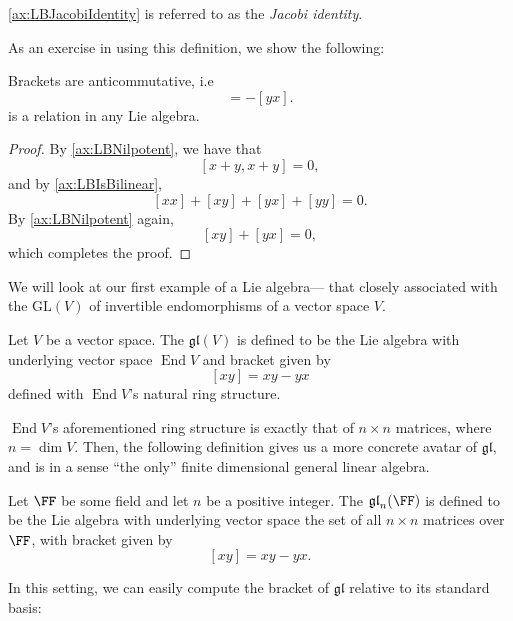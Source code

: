 \documentclass{article}
\newcommand{\lb}[1]{\ensuremath{\left[{#1}\right]}}
\DeclareMathOperator{\End}{End}
\newcommand{\GL}{\ensuremath{\text{GL}}}
\newcommand{\glalg}{\ensuremath{\mathfrak{gl}}}
\begin{document}
\ref{ax:LBJacobiIdentity} is referred to as the \textit{Jacobi identity}.

As an exercise in using this definition, we show the following:

\begin{proposition}
    Brackets are anticommutative, i.e
    \begin{equation}
        [xy]
        =
        -[yx].
        \tag{L2'}
    \end{equation}
    is a relation in any Lie algebra.
\end{proposition}
\begin{proof}
    By \ref{ax:LBNilpotent}, we have that
    \[
        \lb{x+y,x+y}
        =
        0,
    \]
    and by \ref{ax:LBIsBilinear},
    \[
        \lb{xx} + \lb{xy} + \lb{yx} + \lb{yy}
        =
        0.
    \]
    By \ref{ax:LBNilpotent} again,
    \[
        \lb{xy} + \lb{yx}
        =
        0,
    \]
    which completes the proof.
\end{proof}

We will look at our first example of a Lie algebra--- that closely associated with the  $\GL(V)$ of invertible endomorphisms of a vector space $V$.

\begin{definition}[$\glalg$, abstractly]
    Let $V$ be a vector space.
    The  $\glalg(V)$ is defined to be the Lie algebra with underlying vector space $\End V$ and bracket given by
    \[
        \lb{xy}
        =
        xy - yx
    \]
    defined with $\End V$'s natural ring structure.
\end{definition}

    $\End V$'s aforementioned ring structure is exactly that of $n \times n$ matrices, where $n = \dim V$.
    Then, the following definition gives us a more concrete avatar of $\glalg$, and is in a sense ``the only'' finite dimensional general linear algebra.

\begin{definition}[$\glalg$, concretely]
    Let $\FF$ be some field and let $n$ be a positive integer.
    The  $\glalg_n(\FF)$ is defined to be the Lie algebra with underlying vector space the set of all $n \times n$ matrices over $\FF$, with bracket given by
    \[
        \lb{xy}
        =
        xy - yx.
    \]
\end{definition}

In this setting, we can easily compute the bracket of $\glalg$ relative to its standard basis:
\end{document}
